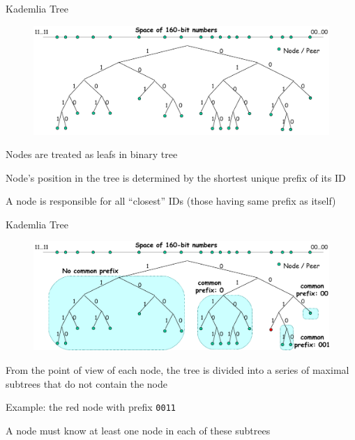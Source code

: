 \begin{frame}[t]{Kademlia Tree}

\begin{figure}
	\includegraphics[width=\textwidth]{kad1}
\end{figure}

\BI
\item Nodes are treated as leafs in binary tree
\item Node's position in the tree is determined by the \alert{shortest unique} prefix of its ID
\item A node is responsible for all “closest” IDs (those having same prefix as itself)
\EI

\end{frame}

\begin{frame}[t]{Kademlia Tree}

\begin{figure}
	\includegraphics[width=\textwidth]{kad2}
\end{figure}

\BI
\item From the point of view of each node, the tree is divided into a series of maximal subtrees that do not contain the node
\item Example: the red node with prefix \texttt{0011}
\item A node must know at least one node in each of these subtrees
\EI

\end{frame}


